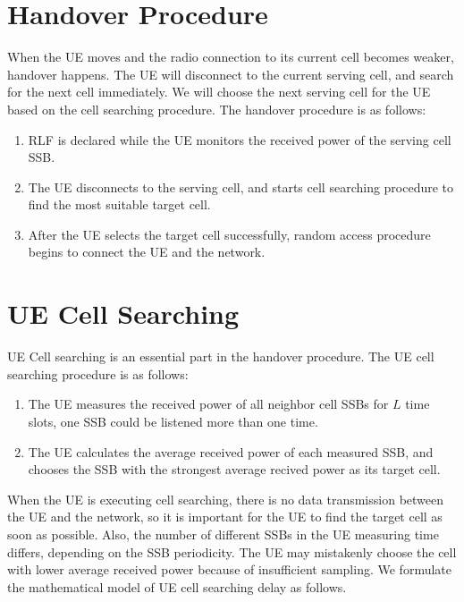 \section{Handover Procedure}
When the UE moves and the radio connection to its current cell becomes weaker, handover happens. The UE will disconnect to the current serving cell, and search for the next cell immediately. We will choose the next serving cell for the UE based on the cell searching procedure. The handover procedure is as follows:
\begin{enumerate}
  \item RLF is declared while the UE monitors the received power of the serving cell SSB. 
  \item The UE disconnects to the serving cell, and starts cell searching procedure to find the most suitable target cell.
  \item After the UE selects the target cell successfully, random access procedure begins to connect the UE and the network. 
\end{enumerate}

\section{UE Cell Searching}
UE Cell searching is an essential part in the handover procedure. The UE cell searching procedure is as follows: 
\begin{enumerate}
  \item The UE measures the received power of all neighbor cell SSBs for $L$ time slots, one SSB could be listened more than one time.
  \item The UE calculates the average received power of each measured SSB, and chooses the SSB with the strongest average recived power as its target cell.
\end{enumerate}
When the UE is executing cell searching, there is no data transmission between the UE and the network, so it is important for the UE to find the target cell as soon as possible. Also, the number of different SSBs in the UE measuring time differs, depending on the SSB periodicity. The UE may mistakenly choose the cell with lower average received power because of insufficient sampling. We formulate the mathematical model of UE cell searching delay as follows. 

